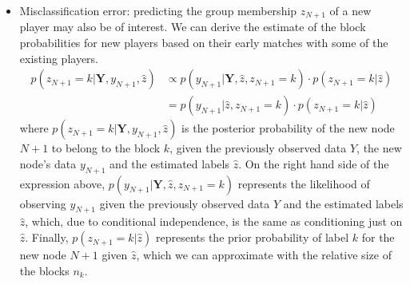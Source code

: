 \documentclass[11pt]{amsart}
\begin{document}
\begin{itemize}
\item Misclassification error: predicting the group membership $z_{N+1}$ of a new player may also be of interest. We can derive the estimate of the block probabilities for new players based on their early matches with some of the existing players.
\begin{align}
p(z_{N+1} = k | \textbf{Y}, y_{N+1}, \hat{z}) &\propto p(y_{N+1} | \textbf{Y}, \hat{z}, z_{N+1} = k ) \cdot p(z_{N+1} = k | \hat{z}) \nonumber \\
&= p(y_{N+1} | \hat{z}, z_{N+1} = k ) \cdot p(z_{N+1} = k | \hat{z})
\end{align}
where $p(z_{N+1} = k | \textbf{Y}, y_{N+1}, \hat{z})$ is the posterior probability of the new node $N+1$ to belong to the block $k$, given the previously observed data $Y$, the new node's data $y_{N+1}$ and the estimated labels $\hat{z}$. On the right hand side of the expression above, $p(y_{N+1} | \textbf{Y}, \hat{z}, z_{N+1} = k )$ represents the likelihood of observing $y_{N+1}$ given the previously observed data $Y$ and the estimated labels $\hat{z}$, which, due to conditional independence, is the same as conditioning just on $\hat{z}$. Finally, $p(z_{N+1} = k | \hat{z})$ represents the prior probability of label $k$ for the new node $N+1$ given $\hat{z}$, which we can approximate with the relative size of the blocks $n_k$.
\end{itemize}
\begin{comment}
\item Prediction error: making prediction on the match score between two players is also possible within this framework. Once we have obtained the MCMC samples, we can retrieve the posterior predictive distribution.

Let us assume $i^\star$ is a new player . The posterior predictive is:
\begin{align}
p(y_{i^\star j}| \textbf{Y}) &= \int p(z| \{ \textbf{Y}\setminus y_{i^\star} \})  \cdot p(y_{i^\star j} | z ) dz \\
&\approx \frac{1}{T} \sum_{t = 1}^{T} \sum_{z_i=1}^{K}  p(y_{i^\star j}| z_j^{(t)}) \\
&=  \frac{1}{T} \sum_{t = 1}^{T} \sum_{z_{i^\star} =1}^{K}  p_{z_{i^\star}, z_j^{(t)}}^{y_{i^\star j} } \cdot (1-p_{z_{i^\star}, z_j^{(t)}})^{n_{i^\star j} -  y_{i^\star j}} \quad \quad \text{for }y_{i^\star j} = 0,\ldots, n_{i^\star j} \\
\end{align} 
where $z_j^{(t)} \sim p(z|Y)$
\end{itemize}
\end{comment}
\end{document}
